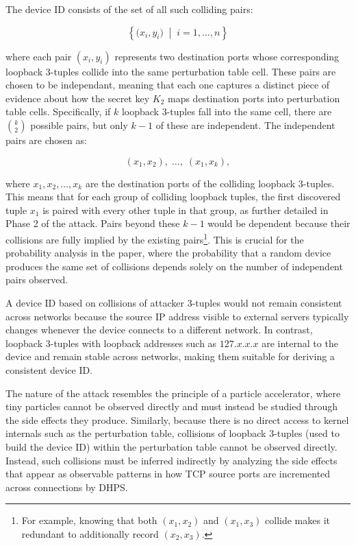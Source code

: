 \documentclass[twocolumn]{report}
\begin{document}
The device ID consists of the set of all such colliding pairs:

\vspace{-0.2cm}
\begin{minipage}{\columnwidth}
	\[
		\left\{ \bigl(x_i, y_i\bigr) \;\middle|\; i = 1, \ldots, n \right\}
	\]
\end{minipage}

where each pair $(x_i, y_i)$ represents \alert{two destination ports} whose corresponding loopback 3-tuples collide into the same perturbation table cell. These pairs are chosen to be \alert{\hypertarget{independant}{independant}}, meaning that each one captures a distinct piece of evidence about how the secret key $K_2$ maps destination ports into perturbation table cells. Specifically, if $k$ loopback 3-tuples fall into the same cell, there are $\binom{k}{2}$ possible pairs, but only $k-1$ of these are independent. The independent pairs are chosen as:

\vspace{-0.2cm}
\begin{minipage}{\columnwidth}
	\[
		(x_1, x_2),\; \ldots,\; (x_1, x_k),
	\]
\end{minipage}

where $x_1, x_2, \ldots, x_k$ are the destination ports of the colliding loopback 3-tuples. This means that for each group of colliding loopback tuples, the first discovered tuple $x_1$ is paired with every other tuple in that group, as further detailed in Phase 2 of the attack. Pairs beyond these $k-1$ would be \alert{dependent} because their collisions are fully implied by the existing pairs\footnote{For example, knowing that both $(x_1, x_2)$ and $(x_1, x_3)$ collide makes it redundant to additionally record $(x_2, x_3)$.}. This is crucial for the probability analysis in the paper, where the probability that a random device produces the same set of collisions depends solely on the number of independent pairs observed.

A device ID based on collisions of \alert{attacker 3-tuples} would not remain consistent across networks because the source IP address visible to external servers typically changes whenever the device connects to a different network. In contrast, \alert{loopback 3-tuples} with loopback addresses such as $127.x.x.x$ are internal to the device and remain stable across networks, making them suitable for deriving a consistent device ID.

The nature of the attack resembles the principle of a \alert{particle accelerator}, where tiny particles cannot be observed directly and must instead be studied through the side effects they produce. Similarly, because there is no direct access to kernel internals such as the perturbation table, collisions of loopback 3-tuples (used to build the device ID) within the perturbation table \alert{cannot be observed directly}. Instead, such collisions must be inferred indirectly by analyzing the side effects that appear as observable patterns in how TCP source ports are incremented across connections by DHPS.
\end{document}
